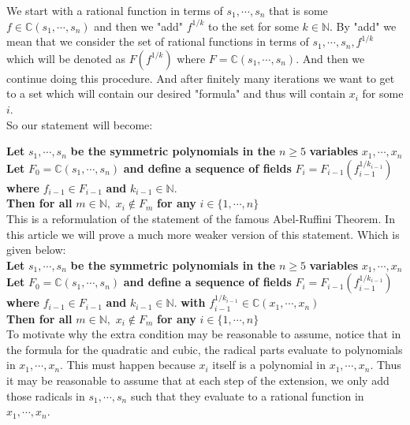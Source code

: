 \documentclass[a4paper,12pt,abstracton]{scrartcl}
\theoremstyle{dotlessP}
\theoremstyle{dotlessS}
\theoremstyle{remark}
\theoremstyle{definition}
\begin{document}
We start with a rational function in terms of $s_1,\cdots,s_n$ that is some $f\in\mathbb{C}(s_1,\cdots,s_n)$ and then we "add" $f^{1/k}$ to the set for some $k\in\mathbb{N}$. By "add" we mean that we consider the set of rational functions in terms of $s_1,\cdots,s_n,f^{1/k}$ which will be denoted as $F(f^{1/k})$ where $F=\mathbb{C}(s_1,\cdots,s_n)$. And then we continue doing this procedure. And after finitely many iterations we want to get to a set which will contain our desired "formula" and thus will contain $x_i$ for some $i$.\\

So our statement will become:

\textbf{Let } $s_1,\cdots,s_n$ \textbf{ be the symmetric polynomials in the } $n\geq 5$ \textbf{ variables } $x_1,\cdots,x_n$ \\ \textbf{Let }  $F_0=\mathbb{C}(s_1,\cdots,s_n)$ \textbf{ and define a sequence of fields } $F_i=F_{i-1}(f_{i-1}^{1/k_{i-1}})$ \textbf{ where } $f_{i-1}\in F_{i-1}$ \textbf{ and } $k_{i-1}\in\mathbb{N}.$ \\
 \textbf{ Then for all } $m\in\mathbb{N},$
$x_i\notin F_m$ \textbf{ for any } $i\in\{1,\cdots,n\}$\\

This is a reformulation of the statement of the famous Abel-Ruffini Theorem. In this article we will prove a much more weaker version of this statement. Which is given below:\\

\textbf{Let } $s_1,\cdots,s_n$ \textbf{ be the symmetric polynomials in the } $n\geq 5$ \textbf{ variables } $x_1,\cdots,x_n$ \\ \textbf{Let }  $F_0=\mathbb{C}(s_1,\cdots,s_n)$ \textbf{ and define a sequence of fields } $F_i=F_{i-1}(f_{i-1}^{1/k_{i-1}})$ \textbf{ where } $f_{i-1}\in F_{i-1}$ \textbf{ and } $k_{i-1}\in\mathbb{N}.$ \textbf{ with } $f_{i-1}^{1/k_{i-1}}\in\mathbb{C}(x_1,\cdots,x_n)$ \\
 \textbf{ Then for all } $m\in\mathbb{N},$
$x_i\notin F_m$ \textbf{ for any } $i\in\{1,\cdots,n\}$\\

To motivate why the extra condition may be reasonable to assume, notice that in the formula for the quadratic and cubic, the radical parts evaluate to polynomials in $x_1,\cdots,x_n$. This must happen because $x_i$ itself is a polynomial in $x_1,\cdots,x_n$. Thus it may be reasonable to assume that at each step of the extension, we only add those radicals in $s_1,\cdots,s_n$ such that they evaluate to a rational function in $x_1,\cdots,x_n$.
\end{document}
